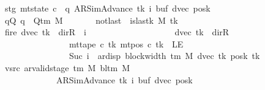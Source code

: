 \begin{isabellebody}
\ \ \ \ \ \ \ stg{\isacharcolon}{\kern0pt}\ {\isachardoublequoteopen}mt{\isacharunderscore}{\kern0pt}state\ c{\isacharprime}{\kern0pt}\ {\isacharequal}{\kern0pt}\ {\isacharparenleft}{\kern0pt}q{\isacharcomma}{\kern0pt}\ AR{\isacharunderscore}{\kern0pt}SimAdvance{\isacharcomma}{\kern0pt}\ tk{\isacharcomma}{\kern0pt}\ i{\isacharcomma}{\kern0pt}\ buf{\isacharcomma}{\kern0pt}\ dvec{\isacharcomma}{\kern0pt}\ posk{\isacharparenright}{\kern0pt}{\isachardoublequoteclose}\isanewline
\ \ \ \ \ \ \ qQ{\isacharcolon}{\kern0pt}\ {\isachardoublequoteopen}q\ {\isasymin}\ Q{\isacharunderscore}{\kern0pt}tm\ M{\isachardoublequoteclose}\isanewline
\ \ \ \ \ \ \ notlast{\isacharcolon}{\kern0pt}\ {\isachardoublequoteopen}{\isasymnot}\ is{\isacharunderscore}{\kern0pt}last{\isacharunderscore}{\kern0pt}k\ M\ tk{\isachardoublequoteclose}\isanewline
\ \ \ \ \ \ \ fire{\isacharcolon}{\kern0pt}\ {\isachardoublequoteopen}{\isacharparenleft}{\kern0pt}dvec\ tk\ {\isacharequal}{\kern0pt}\ dir{\isachardot}{\kern0pt}R\ {\isasymand}\ i\ {\isacharequal}{\kern0pt}\ {}{\isacharparenright}{\kern0pt}\isanewline
\ \ \ \ \ \ \ \ \ \ \ \ \ \ \ \ \ {\isasymor}\ {\isacharparenleft}{\kern0pt}dvec\ tk\ {\isasymnoteq}\ dir{\isachardot}{\kern0pt}R\isanewline
\ \ \ \ \ \ \ \ \ \ \ \ \ \ \ \ \ \ \ \ \ {\isasymand}\ mt{\isacharunderscore}{\kern0pt}tape\ c{\isacharprime}{\kern0pt}\ tk\ {\isacharparenleft}{\kern0pt}mt{\isacharunderscore}{\kern0pt}pos\ c{\isacharprime}{\kern0pt}\ tk{\isacharparenright}{\kern0pt}\ {\isasymnoteq}\ LE{}\isanewline
\ \ \ \ \ \ \ \ \ \ \ \ \ \ \ \ \ \ \ \ \ {\isasymand}\ Suc\ i\ {\isacharequal}{\kern0pt}\ ar{\isacharunderscore}{\kern0pt}disp\ {\isacharparenleft}{\kern0pt}block{\isacharunderscore}{\kern0pt}width\ {\isacharparenleft}{\kern0pt}{\isasymGamma}{\isacharunderscore}{\kern0pt}tm\ M{\isacharparenright}{\kern0pt}{\isacharparenright}{\kern0pt}\ {\isacharparenleft}{\kern0pt}dvec\ tk{\isacharparenright}{\kern0pt}\ {\isacharparenleft}{\kern0pt}posk\ tk{\isacharparenright}{\kern0pt}{\isacharparenright}{\kern0pt}{\isachardoublequoteclose}\isanewline
\ \ \ \ \ \ \ vsrc{\isacharcolon}{\kern0pt}\ {\isachardoublequoteopen}ar{\isacharunderscore}{\kern0pt}valid{\isacharunderscore}{\kern0pt}stage\ {\isacharparenleft}{\kern0pt}{\isasymGamma}{\isacharunderscore}{\kern0pt}tm\ M{\isacharparenright}{\kern0pt}\ {\isacharparenleft}{\kern0pt}bl{\isacharunderscore}{\kern0pt}tm\ M{\isacharparenright}{\kern0pt}\isanewline
\ \ \ \ \ \ \ \ \ \ \ \ \ \ \ \ \ \ \ {\isacharparenleft}{\kern0pt}AR{\isacharunderscore}{\kern0pt}SimAdvance{\isacharcomma}{\kern0pt}\ tk{\isacharcomma}{\kern0pt}\ i{\isacharcomma}{\kern0pt}\ buf{\isacharcomma}{\kern0pt}\ dvec{\isacharcomma}{\kern0pt}\ posk{\isacharparenright}{\kern0pt}{\isachardoublequoteclose}\isanewline

\end{isabellebody}

